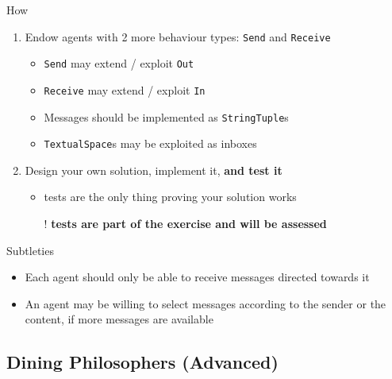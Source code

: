 \documentclass[presentation]{beamer}\mode<presentation>{\usetheme{AMSCesenaPurpleAndGold}}
\begin{document}
\begin{frame}[allowframebreaks]
	\begin{block}{How}
		\begin{enumerate}
			\item Endow agents with 2 more behaviour types: \alert{\texttt{Send}} and \alert{\texttt{Receive}}
			\begin{itemize}
				\item \texttt{Send} may extend / exploit \texttt{Out}
				\item \texttt{Receive} may extend / exploit \texttt{In}
				\item Messages should be implemented as \texttt{StringTuple}s
				\item \texttt{TextualSpace}s may be exploited as \alert{inboxes}
			\end{itemize}
			\item Design your own solution, implement it, \textbf{and test it}
			\begin{itemize}
				\item tests are the only thing proving your solution works
				\item[!] \textbf{tests are part of the exercise and will be assessed}
			\end{itemize}
		\end{enumerate}
	\end{block}

	\begin{exampleblock}{Subtleties}
		\begin{itemize}
			\item Each agent should only be able to receive messages \alert{directed towards it}
			\item An agent may be willing to \alert{select} messages according to the sender or the content, if more messages are available
		\end{itemize}
	\end{exampleblock}
\end{frame}

\startExercise

\subsection{Dining Philosophers (Advanced)} 
\end{document}
